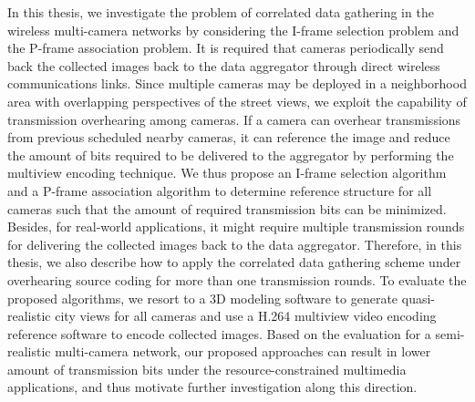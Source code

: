 In this thesis, we investigate the problem of correlated data gathering in the wireless multi-camera networks by considering the I-frame selection problem and the P-frame association problem.
It is required that cameras periodically send back the collected images back to the data aggregator through direct wireless communications links.
Since multiple cameras may be deployed in a neighborhood area with overlapping perspectives of the street views, we exploit the capability of transmission overhearing among cameras.
If a camera can overhear transmissions from previous scheduled nearby cameras, it can reference the image and reduce the amount of bits required to be delivered to the aggregator by performing the multiview encoding technique.
We thus propose an I-frame selection algorithm and a P-frame association algorithm to determine reference structure for all cameras such that the amount of required transmission bits can be minimized.
Besides, for real-world applications, it might require multiple transmission rounds for delivering the collected images back to the data aggregator.
Therefore, in this thesis, we also describe how to apply the correlated data gathering scheme under overhearing source coding for more than one transmission rounds.
To evaluate the proposed algorithms, we resort to a 3D modeling software to generate quasi-realistic city views for all cameras and use a H.264 multiview video encoding reference software to encode collected images.
Based on the evaluation for a semi-realistic multi-camera network, our proposed approaches can result in lower amount of transmission bits under the resource-constrained multimedia applications, and thus motivate further investigation along this direction.